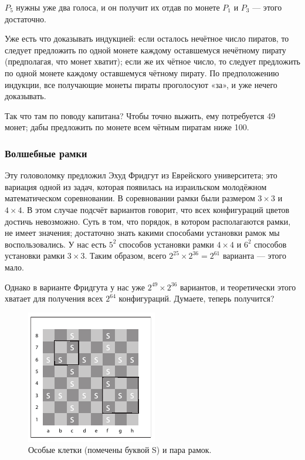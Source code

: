 $P_5$ нужны уже два голоса, и он получит их отдав по монете $P_1$ и $P_3$ --- этого достаточно.

Уже есть что доказывать индукцией:
если осталось нечётное число пиратов, то следует предложить по одной монете каждому оставшемуся нечётному пирату (предполагая, что монет хватит);
если же их чётное число, то следует предложить по одной монете каждому оставшемуся чётному пирату.
По предположению индукции, все получающие монеты пираты проголосуют «за», и уже нечего доказывать.

Так что там по поводу капитана?
Чтобы точно выжить, ему потребуется 49 монет; дабы предложить по монете всем чётным пиратам ниже 100.

\subsubsection*{Волшебные рамки}

Эту головоломку предложил Эхуд Фридгут из Еврейского университета; это вариация одной из задач, которая появилась на израильском молодёжном математическом соревновании.
В соревновании рамки были размером $3 \times 3$ и $4 \times 4$.
В этом случае подсчёт вариантов говорит, что всех конфигураций цветов достичь невозможно.
Суть в том, что порядок, в котором располагаются рамки, не имеет значения;
достаточно знать какими способами установки рамок мы воспользовались.
У нас есть $5^2$ способов установки рамки $4 \times 4$
и $6^2$ способов установки рамки $3 \times 3$.
Таким образом, всего $2^{25} \times 2^{36} = 2^{61}$ варианта — этого мало.

Однако в варианте Фридгута у нас уже $2^{49} \times 2^{36}$ вариантов, и теоретически этого хватает для получения всех $2^{64}$ конфигураций.
Думаете, теперь получится?

\begin{figure}[ht!]
\centering
\includegraphics[scale=1]{pics/chess}
\caption{Особые клетки (помечены буквой S) и пара рамок.}
\label{pic:chess1}
\end{figure}

